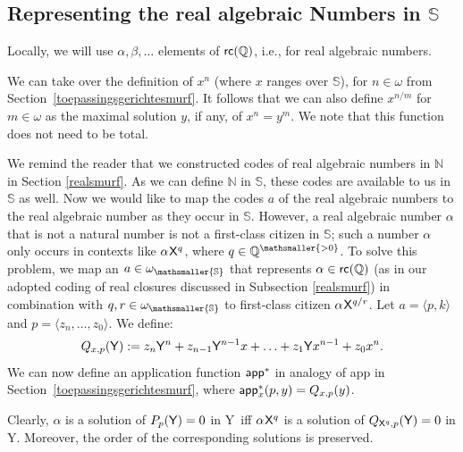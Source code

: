 \documentclass{amsart}
\newcommand{\tupel}[1]{{\langle #1 \rangle}}
\newcommand{\X}{{\sf X}}
\newcommand{\Y}{{\sf Y}}
\newcommand{\sm}{\hspace{0.025cm}}
\newcommand{\rc}{{\sf rc}}
\begin{document}
\subsection{Representing the real algebraic Numbers in $\mathbb S$}\label{sect_repr_real_alg}
Locally, we will use $\alpha,\beta,\dots$ elements of $\rc(\mathbb{Q})$, i.e., for real algebraic numbers. 

We can take over the definition of $x^n$ (where $x$ ranges over $\mathbb S$), for $n\in \omega$ from Section~\ref{toepassingsgerichtesmurf}.
It follows that we can also define $x^{n/m}$ for $m\in \omega$ as the maximal solution $y$, if any, of $x^n = y^m$.
We note that this function does not need to be total.

We remind the reader that we constructed codes of real algebraic numbers in $\mathbb{N}$ in Section \ref{realsmurf}. As we can define $\mathbb{N}$ in $\mathbb{S}$, these codes are available to us in $\mathbb{S}$ as well. Now we would like to map the codes $a$ of the real algebraic numbers to the real algebraic number as they occur
in $\mathbb S$. However, a real algebraic number $\alpha$ that is not a natural number is not a first-class citizen in $\mathbb S$; such a number $\alpha$  only occurs
in contexts like $\alpha\sm\X^{q}$, where $q\in \mathbb{Q}^{\mathsmaller{> 0}}$. To solve this problem, we map an $a\in\omega_{\mathsmaller{\mathbb S}}$ that represents $\alpha\in\rc(\mathbb{Q})$ (as in our adopted coding of real closures discussed in Subsection \ref{realsmurf}) in combination
with $q,r\in \omega_{\mathsmaller {\mathbb S}}$ to first-class citizen $\alpha\sm\X^{q/r}$.
Let $a= \tupel{p,k}$ and $p=\tupel{z_n,\ldots,z_0}$. 
We define:
\[Q_{x,p}(\Y) := z_n \Y^n + z_{n-1}\Y^{n-1}x + \ldots + z_1\Y x^{n-1} + z_0x^{n}.\]
We can now define an application function ${\sf app}^\ast$ in analogy of {\sf app} in Section~\ref{toepassingsgerichtesmurf},
where ${\sf app}_{x}^\ast(p,y) = Q_{x,p}(y)$.

Clearly, $\alpha$ is a solution of 
$P_p(\Y)=0$ in \Y\ iff  $\alpha\sm\X^{q}$ is a solution of $Q_{\X^{q},p}(\Y)=0$ in \Y. Moreover, the order of the corresponding solutions is preserved. 
\end{document}
